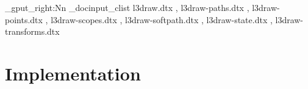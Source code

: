 \documentclass{l3doc}
\begin{document}
\makeatletter
\let\DelayPrintIndex\PrintIndex
\let\PrintIndex\@empty
\makeatother

\ExplSyntaxOn
\clist_gput_right:Nn \g_docinput_clist
  {
    l3draw.dtx            ,
    l3draw-paths.dtx      ,
    l3draw-points.dtx     ,
    l3draw-scopes.dtx     ,
    l3draw-softpath.dtx   ,
    l3draw-state.dtx      ,
    l3draw-transforms.dtx
  }
\ExplSyntaxOff

\part{Implementation}

\def\maketitle{}
\EnableImplementation
\DisableDocumentation
\DocInputAgain

\clearpage

\DelayPrintIndex
\end{document}
